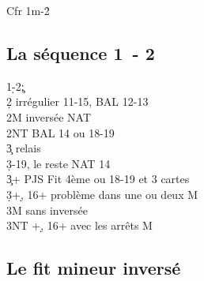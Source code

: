 \documentclass[a4paper]{article}
\begin{document}
Cfr 1m-2\h 

\subsection{La séquence 1\pdfd\ - 2\pdfc}

\begin{bidtable}
1\d-2\c;\\
2\d \> irrégulier 11-15, BAL 12-13\\
2M \> inversée NAT\\
2NT \> BAL 14 ou 18-19\+\\
3\c \> relais\+\\
3\d {}-19, le reste NAT 14\-\-\\
3\c {}+ PJS Fit 4ème ou 18-19 et 3 cartes\\
3\d {}+\d , 16+ problème dans une ou deux M\\
3M  sans inversée\\
3NT +\d , 16+ avec les arrêts M
\end{bidtable}

\subsection{Le fit mineur inversé}
\end{document}
